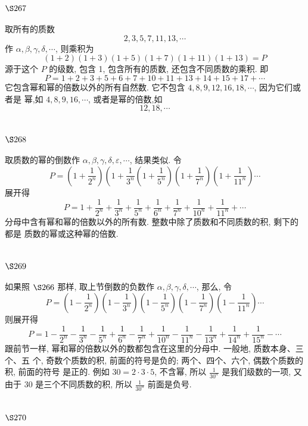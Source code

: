\section{$\S 267$}

取所有的质数
\[
2,3,5,7,11,13, \cdots
\]
作 $\alpha, \beta, \gamma, \delta, \cdots$, 则乘积为
\[
(1+2)(1+3)(1+5)(1+7)(1+11)(1+13)=P
\]
源于这个 $P$ 的级数, 包含 1, 包含所有的质数, 还包含不同质数的乘积. 即
\[
P=1+2+3+5+6+7+10+11+13+14+15+17+\cdots
\]
它包含幂和幂的倍数以外的所有自然数. 它不包含 $4,8,9,12,16,18, \cdots$, 因为它们或者是 幂,如 $4,8,9,16, \cdots$, 或者是幂的倍数,如
\[
12,18, \cdots
\]
\section{$\S 268$}

取质数的幂的倒数作 $\alpha, \beta, \gamma, \delta, \varepsilon, \cdots$, 结果类似. 令
\[
P=\left(1+\frac{1}{2^{n}}\right)\left(1+\frac{1}{3^{n}}\left(1+\frac{1}{5^{n}}\right)\left(1+\frac{1}{7^{n}}\right)\left(1+\frac{1}{11^{n}}\right) \cdots\right.
\]
展开得
\[
P=1+\frac{1}{2^{n}}+\frac{1}{3^{n}}+\frac{1}{5^{n}}+\frac{1}{6^{n}}+\frac{1}{7^{n}}+\frac{1}{10^{n}}+\frac{1}{11^{n}}+\cdots
\]
分母中含有幂和幂的倍数以外的所有数. 整数中除了质数和不同质数的积, 剩下的都是 质数的幂或这种幂的倍数.

\section{$\S 269$}

如果照 $\S 266$ 那样, 取上节倒数的负数作 $\alpha, \beta, \gamma, \delta, \cdots$, 那么, 令
\[
P=\left(1-\frac{1}{2^{n}}\right)\left(1-\frac{1}{3^{n}}\right)\left(1-\frac{1}{5^{n}}\right)\left(1-\frac{1}{7^{n}}\right)\left(1-\frac{1}{11^{n}}\right) \cdots
\]
则展开得
\[
P=1-\frac{1}{2^{n}}-\frac{1}{3^{n}}-\frac{1}{5^{n}}+\frac{1}{6^{n}}-\frac{1}{7^{n}}+\frac{1}{10^{n}}-\frac{1}{11^{n}}-\frac{1}{13^{n}}+\frac{1}{14^{n}}+\frac{1}{15^{n}}-\cdots
\]
跟前节一样, 幂和幂的倍数以外的数都包含在这里的分母中. 一般地, 质数本身、三个、五 个, 奇数个质数的积, 前面的符号是负的; 两个、四个、六个, 偶数个质数的积, 前面的符号 是正的. 例如 $30=2 \cdot 3 \cdot 5$, 不含幂, 所以 $\frac{1}{30^{n}}$ 是我们级数的一项, 又由于 30 是三个不同质数的积, 所以 $\frac{1}{30^{n}}$ 前面是负号.

\section{$\S 270$}

